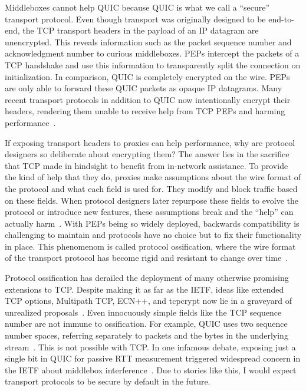 Middleboxes cannot help QUIC because QUIC is what we call a ``secure'' transport
protocol. Even though transport was originally designed to be end-to-end, the
TCP transport headers in the payload of an IP datagram are unencrypted. This
reveals information such as the packet sequence number and acknowledgment
number to curious middleboxes. PEPs intercept the packets of a TCP handshake
and use this information to transparently split the connection on
initialization. In comparison, QUIC is completely encrypted on the wire. PEPs
are only able to forward these QUIC packets as opaque IP datagrams. Many recent
transport protocols in addition to QUIC now intentionally encrypt their
headers, rendering them unable to receive help from TCP PEPs and harming
performance~\cite{rfc8834webrtc,zoom,bittorrent,winstein2012mosh}.

If exposing transport headers to proxies can help performance, why are protocol
designers so deliberate about encrypting them? The answer lies in the sacrifice
that TCP made in hindsight to benefit from in-network assistance. To provide
the kind of help that they do, proxies make assumptions about the wire format
of the protocol and what each field is used for. They modify and block traffic
based on these fields. When protocol designers later repurpose these fields to
evolve the protocol or introduce new features, these assumptions break and the
``help'' can actually
harm~\cite{border2020quicsat-presentation,kuhn2021quic-over-sat,martin2022suitability,border2020evaluating,kosek2022quicpep}.
With PEPs being so widely deployed, backwards
compatibility is challenging to maintain and protocols have no choice but to
fix their functionality in place. This phenomenom is called protocol
ossification, where the wire format of the transport protocol has become
rigid and resistant to change over time~\cite{papastergiou2017deossifying, edeline2019bottomup}.

Protocol ossification has derailed the deployment of many otherwise promising
extensions to TCP. Despite making it as far as the IETF, ideas like
extended TCP options, Multipath TCP, ECN++, and tcpcrypt now lie in a graveyard
of unrealized proposals~\cite{mandalari2018ecnplusplus,honda2011still,raiciu2012multipathtcp,rfc8548}.
Even innocuously simple fields like the TCP sequence
number are not immune to ossification. For example, QUIC uses two sequence
number spaces, referring separately to packets and the bytes in the underlying
stream~\cite{rfc9000}. This is not possible with TCP. In one infamous debate,
exposing just a single bit in QUIC for passive RTT measurement triggered
widespread concern in the IETF about middlebox interference~\cite{quicbit2018}.
Due to stories like this, I would expect transport protocols to be secure by default
in the future.

